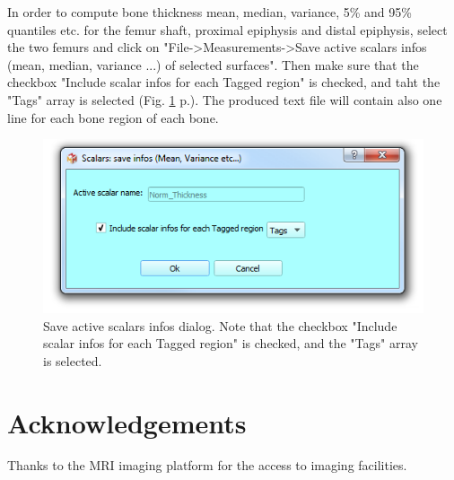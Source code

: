\documentclass[12pt, a4paper]{book}
\begin{document}
In order to compute bone thickness mean, median, variance, 5\% and 95\% quantiles etc. for the femur shaft, proximal epiphysis and distal epiphysis, select the two femurs and click on "File->Measurements->Save active scalars infos (mean, median, variance ...) of selected surfaces". Then make sure that the checkbox "Include scalar infos for each Tagged region" is checked, and taht the "Tags" array is selected  (Fig. \ref{scalars_infos} p.\pageref{scalars_infos}). The produced text file will contain also one line for each bone region of each bone.
\begin{figure}
  \centering
  \includegraphics[scale=0.5]{Save_scalar_infos.png}
\caption{Save active scalars infos dialog. Note that the checkbox "Include scalar infos for each Tagged region" is checked, and the "Tags" array is selected.}	
\label{scalars_infos}
 \end{figure}
\section{Acknowledgements}
Thanks to the MRI imaging platform for the access to imaging facilities.





\end{document}
